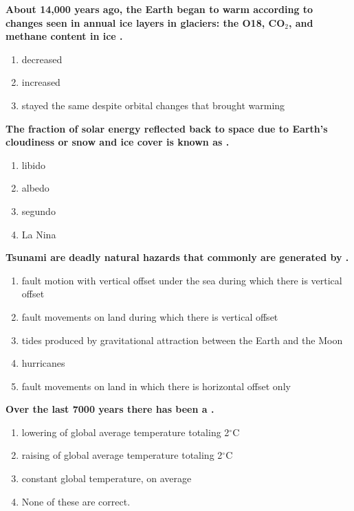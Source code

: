 \item {
\setlength{\itemsep}{0cm}
\setlength{\parskip}{.2cm}
\begin{samepage}
\textbf{
About 14,000 years ago, the Earth began to warm according to changes seen in annual ice layers in glaciers: the O18, CO\ensuremath{_2}, and methane content in ice \makebox[1cm]{\Rivpt\hrulefill\Rivpt}.
}
\begin{enumerate}
\item {  decreased }
\item {  increased }
\item {  stayed the same despite orbital changes that brought warming }
\end{enumerate}
\end{samepage}
}
\item {
\setlength{\itemsep}{0cm}
\setlength{\parskip}{.2cm}
\begin{samepage}
\textbf{
The fraction of solar energy reflected back to space due to Earth's cloudiness or snow and ice cover is known as \makebox[1cm]{\Rivpt\hrulefill\Rivpt}.
}
\begin{enumerate}
\item {  libido }
\item {  albedo }
\item {  segundo }
\item {  La Nina }
\end{enumerate}
\end{samepage}
}
\item {
\setlength{\itemsep}{0cm}
\setlength{\parskip}{.2cm}
\begin{samepage}
\textbf{
Tsunami are deadly natural hazards that commonly are generated by \makebox[1cm]{\Rivpt\hrulefill\Rivpt}.
}
\begin{enumerate}
\item { 	fault motion with vertical offset under the sea during which there is vertical offset }
\item { 	fault movements on land during which there is vertical offset }
\item { 	tides produced by gravitational attraction between the Earth and the Moon }
\item { 	hurricanes }
\item { 	fault movements on land in which there is horizontal offset only 		 }
\end{enumerate}
\end{samepage}
}
\item {
\setlength{\itemsep}{0cm}
\setlength{\parskip}{.2cm}
\begin{samepage}
\textbf{
Over the last 7000 years there has been a \makebox[1cm]{\Rivpt\hrulefill\Rivpt}.
}
\begin{enumerate}
\item {  lowering of global average temperature totaling 2\ensuremath{^\circ}C }
\item {  raising of global average temperature totaling 2\ensuremath{^\circ}C }
\item {  constant global temperature, on average  }
\item {  None of these are correct. }
\end{enumerate}
\end{samepage}
}
